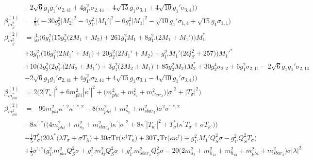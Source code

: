 {\begin{align}
 &-2 \sqrt{6} g_1 g_1' \sigma_{2,41} +4 g_{1'}^{2} \sigma_{2,44} -4 \sqrt{15} g_1 \sigma_{3,1} +4 \sqrt{10} g_1' \sigma_{3,4} \Big)\Big)\\ 
\beta_{m_{\bar{h'}}^2}^{(1)} & =  
\frac{1}{5} \Big(-30 g_{2}^{2} |M_2|^2  -4 g_{1'}^{2} |M_1'|^2  -6 g_{1}^{2} |M_1|^2  - \sqrt{10} g_1' \sigma_{1,4}  + \sqrt{15} g_1 \sigma_{1,1} \Big)\\ 
\beta_{m_{\bar{h'}}^2}^{(2)} & =  
\frac{1}{50} \Big(6 g_{1}^{2} \Big(15 g_{2}^{2} \Big(2 M_1  + M_2\Big) + 261 g_{1}^{2} M_1  + 8 g_{1'}^{2} \Big(2 M_1  + M_1'\Big)\Big)M_1^* \nonumber \\ 
 &+3 g_{1'}^{2} \Big(16 g_{1}^{2} \Big(2 M_1'  + M_1\Big) + 20 g_{2}^{2} \Big(2 M_1'  + M_2\Big) + g_{1'}^{2} M_1' \Big(2 Q_{S}^{2}  + 257\Big)\Big)M_1'^* \nonumber \\ 
 &+10 \Big(3 g_{2}^{2} \Big(2 g_{1'}^{2} \Big(2 M_2  + M_1'\Big) + 3 g_{1}^{2} \Big(2 M_2  + M_1\Big) + 85 g_{2}^{2} M_2 \Big)M_2^* +30 g_{2}^{4} \sigma_{2,2} +6 g_{1}^{2} \sigma_{2,11} -2 \sqrt{6} g_1 g_1' \sigma_{2,14} \nonumber \\ 
 &-2 \sqrt{6} g_1 g_1' \sigma_{2,41} +4 g_{1'}^{2} \sigma_{2,44} +4 \sqrt{15} g_1 \sigma_{3,1} -4 \sqrt{10} g_1' \sigma_{3,4} \Big)\Big)\\ 
\beta_{m_{phi}^2}^{(1)} & =  
2 \Big(2 |T_{\kappa^\prime}|^2  + 6 m_{phi}^2 |\kappa^\prime|^2  + \Big(m_{phi}^2 + m_{s_3}^2 + m_{sbar_3}^2\Big)|\sigma|^2  + |T_{\sigma}|^2\Big)\\ 
\beta_{m_{phi}^2}^{(2)} & =  
-96 m_{phi}^2 \kappa^{\prime,2} \kappa^{\prime,*,2} -8 \Big(m_{phi}^2 + m_{s_3}^2 + m_{sbar_3}^2\Big)\sigma^{2} \sigma^{\prime,*,2} \nonumber \\ 
 &-8 \kappa^{\prime,*} \Big(\Big(4 m_{phi}^2  + m_{s_3}^2 + m_{sbar_3}^2\Big)\kappa^\prime |\sigma|^2  + 8 \kappa^\prime |T_{\kappa^\prime}|^2  + T_{\sigma}^* \Big(\kappa^\prime T_{\sigma}  + \sigma T_{\kappa^\prime} \Big)\Big)\nonumber \\ 
 &-\frac{1}{5} T_{\sigma}^* \Big(20 \lambda^* \Big(\lambda T_{\sigma}  + \sigma T_{\lambda} \Big) + 30 \sigma \mbox{Tr}\Big({\kappa^{\dagger}  T_{\kappa}}\Big)  + 30 T_{\sigma} \mbox{Tr}\Big({\kappa  \kappa^{\dagger}}\Big)  + g_{1'}^{2} M_1' Q_{S}^{2} \sigma  - g_{1'}^{2} Q_{S}^{2} T_{\sigma} \Big)\nonumber \\ 
 &+\frac{1}{5} \sigma^{\prime,*} \Big(g_{1'}^{2} m_{phi}^2 Q_{S}^{2} \sigma +g_{1'}^{2} m_{s_3}^2 Q_{S}^{2} \sigma +g_{1'}^{2} m_{sbar_3}^2 Q_{S}^{2} \sigma -20 \Big(2 m_{s_3}^2  + m_{h_{13}}^2 + m_{h_{23}}^2 + m_{phi}^2 + m_{sbar_3}^2\Big)\sigma |\lambda|^2 \nonumber \\ 

\end{align}}

